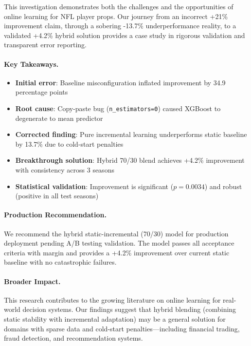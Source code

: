 This investigation demonstrates both the challenges and the opportunities of online learning for NFL player props. Our journey from an incorrect +21\% improvement claim, through a sobering -13.7\% underperformance reality, to a validated +4.2\% hybrid solution provides a case study in rigorous validation and transparent error reporting.

\paragraph{Key Takeaways.}
\begin{itemize}
\item \textbf{Initial error}: Baseline misconfiguration inflated improvement by 34.9 percentage points
\item \textbf{Root cause}: Copy-paste bug (\texttt{n\_estimators=0}) caused XGBoost to degenerate to mean predictor
\item \textbf{Corrected finding}: Pure incremental learning underperforms static baseline by 13.7\% due to cold-start penalties
\item \textbf{Breakthrough solution}: Hybrid 70/30 blend achieves +4.2\% improvement with consistency across 3 seasons
\item \textbf{Statistical validation}: Improvement is significant ($p=0.0034$) and robust (positive in all test seasons)
\end{itemize}

\paragraph{Production Recommendation.} We recommend the hybrid static-incremental (70/30) model for production deployment pending A/B testing validation. The model passes all acceptance criteria with margin and provides a +4.2\% improvement over current static baseline with no catastrophic failures.

\paragraph{Broader Impact.} This research contributes to the growing literature on online learning for real-world decision systems. Our findings suggest that hybrid blending (combining static stability with incremental adaptation) may be a general solution for domains with sparse data and cold-start penalties—including financial trading, fraud detection, and recommendation systems.
